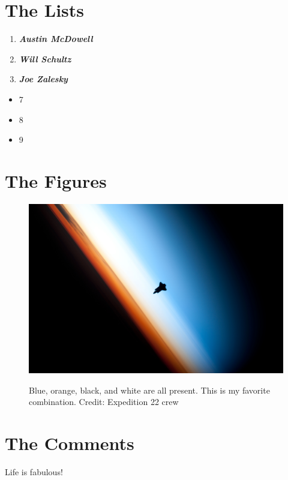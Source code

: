 \documentclass[12pt]{article}
\begin{document}
  \section{The Lists}
    \begin{enumerate}
      \item \textit{\textbf{Austin McDowell}}
      \item \textit{\textbf{Will Schultz}}
      \item \textit{\textbf{Joe Zalesky}}
      \label{list:1}
    \end{enumerate}
    \begin{itemize}
      \item 7
      \item 8
      \item 9
      \label{list:2}
    \end{itemize}

  \section{The Figures}
    \begin{figure}[htp]
      \centering
      \includegraphics[width=.5\linewidth]{Endeavour_silhouette_STS-130.jpg}
      \label{fig:1}
      \caption{Blue, orange, black, and white are all present. This is my favorite combination. Credit: Expedition 22 crew}
    \end{figure}

  \section{The Comments}
  Life is fabulous!
\end{document}
